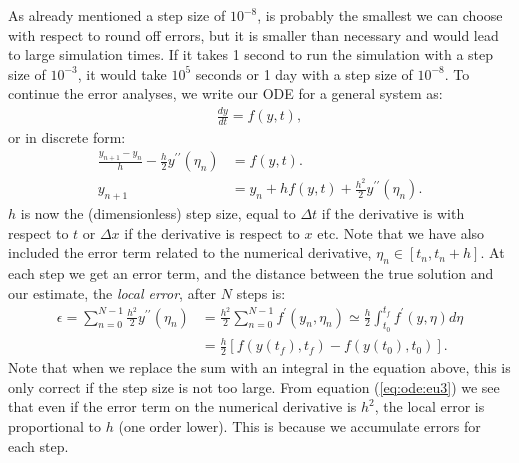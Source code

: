 \documentclass[graybox,sectrefs,envcountresetchap,open=right,final]{svmonodo}
\begin{document}
As already mentioned a step size of $10^{-8}$, is probably the smallest we can choose with respect to round off errors, 
but it is smaller than necessary and would lead to large simulation times. 
If it takes 1 second to run the simulation with a step size of $10^{-3}$, it would take $10^5$ seconds or 1 day
with a step size of $10^{-8}$. 
To continue the error analyses, we write our ODE for a general system as:
\begin{align}
\frac{dy}{dt}=f(y,t),\label{eq:ode:ode}
\end{align}
or in discrete form:
\begin{align}
\frac{y_{n+1}-y_n}{h}-\frac{h}{2}y^{\prime\prime}(\eta_n)&=f(y,t).\nonumber\\ 
y_{n+1}&=y_n+hf(y,t)+\frac{h^2}{2}y^{\prime\prime}(\eta_n).
\end{align}
$h$ is now the (dimensionless) step size, equal to $\Delta t$ if the derivative is with respect to $t$ or $\Delta x$ if the derivative is respect to $x$ etc. Note that we
have also included the error term related to the numerical derivative, $\eta_n\in[t_n,t_n+h]$. At each step we get an error term,
and the distance between the true solution and our estimate, the \emph{local error}, after $N$ steps is:
\begin{align}
\epsilon=\sum_{n=0}^{N-1}\frac{h^2}{2}y^{\prime\prime}(\eta_n)&=\frac{h^2}{2}\sum_{n=0}^{N-1}f^\prime(y_n,\eta_n)\simeq\frac{h}{2}\int_{t_0}^{t_f}f^\prime(y,\eta)d\eta\nonumber\\ 
&=\frac{h}{2}\left[f(y(t_f),t_f)-f(y(t_0),t_0)\right].\label{eq:ode:eu3}
\end{align}
Note that when we replace the sum with an integral in the equation above, this is only correct if the step size is not too large.
From equation (\ref{eq:ode:eu3})
we see that even if the error term on the numerical derivative is $h^2$, the local error is proportional to $h$
(one order lower). This is because we accumulate errors for each step.
\end{document}
